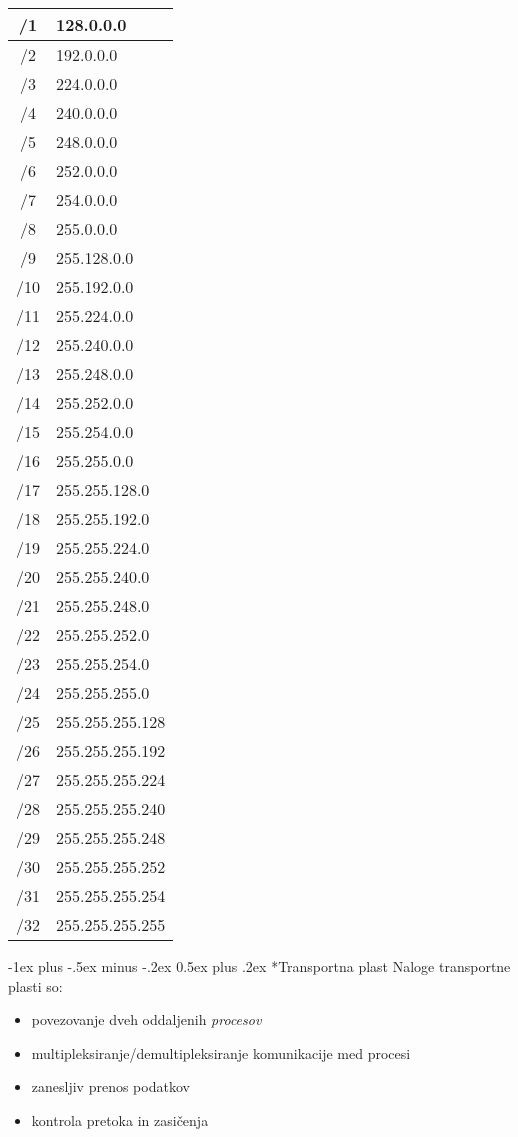 \documentclass[a4paper,8pt]{extarticle}
\makeatletter
\renewcommand{\section}{\@startsection{section}{1}{0mm}%
                                {-1ex plus -.5ex minus -.2ex}%
                                {0.5ex plus .2ex}%
                                {\normalfont\large\bfseries}}
\makeatother
\begin{document}
\begin{multicols}{4}
\begin{center}
\begin{tabular}{|c|l|}
	\hline
	/1	& 128.0.0.0       \\ \hline
	/2	& 192.0.0.0       \\ \hline
	/3	& 224.0.0.0       \\ \hline
	/4	& 240.0.0.0       \\ \hline
	/5	& 248.0.0.0       \\ \hline
	/6	& 252.0.0.0       \\ \hline
	/7	& 254.0.0.0       \\ \hline
	/8	& 255.0.0.0       \\ \hline
	/9	& 255.128.0.0     \\ \hline
	/10	& 255.192.0.0     \\ \hline
	/11	& 255.224.0.0     \\ \hline
	/12	& 255.240.0.0     \\ \hline
	/13	& 255.248.0.0     \\ \hline
	/14	& 255.252.0.0     \\ \hline
	/15	& 255.254.0.0     \\ \hline
	/16	& 255.255.0.0     \\ \hline
	/17	& 255.255.128.0   \\ \hline
	/18	& 255.255.192.0   \\ \hline
	/19	& 255.255.224.0   \\ \hline
	/20	& 255.255.240.0   \\ \hline
	/21	& 255.255.248.0   \\ \hline
	/22	& 255.255.252.0   \\ \hline
	/23	& 255.255.254.0   \\ \hline
	/24	& 255.255.255.0   \\ \hline
	/25	& 255.255.255.128 \\ \hline
	/26	& 255.255.255.192 \\ \hline
	/27	& 255.255.255.224 \\ \hline
	/28	& 255.255.255.240 \\ \hline
	/29	& 255.255.255.248 \\ \hline
	/30	& 255.255.255.252 \\ \hline
	/31	& 255.255.255.254 \\ \hline
	/32	& 255.255.255.255  \\ \hline
\end{tabular}
\end{center}


\section*{Transportna plast}
Naloge transportne plasti so:
\begin{itemize}
	\item povezovanje dveh oddaljenih \emph{procesov}
	\item multipleksiranje/demultipleksiranje komunikacije med procesi
	\item zanesljiv prenos podatkov
	\item kontrola pretoka in zasičenja
\end{itemize}


\end{multicols}
\end{document}
